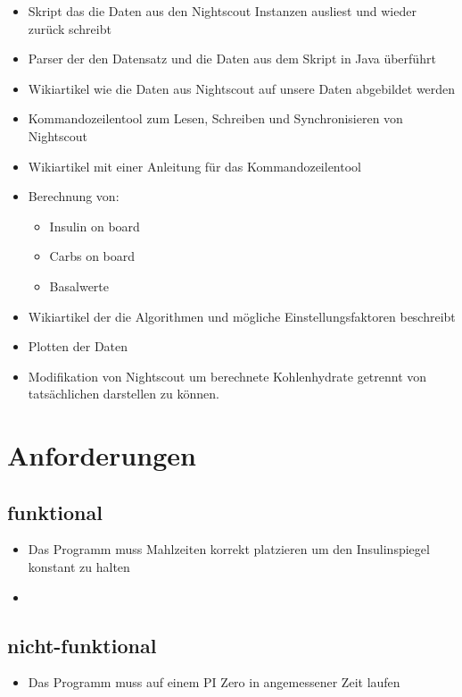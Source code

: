 \documentclass[accentcolor=tud0b,12pt,paper=a4]{tudreport}
\begin{document}
\begin{itemize}
	\item Skript das die Daten aus den Nightscout Instanzen ausliest und wieder zurück schreibt
	\item Parser der den Datensatz und die Daten aus dem Skript in Java überführt
	\item Wikiartikel wie die Daten aus Nightscout auf unsere Daten abgebildet werden
	\item Kommandozeilentool zum Lesen, Schreiben und Synchronisieren von Nightscout
	\item Wikiartikel mit einer Anleitung für das Kommandozeilentool
	\item Berechnung von:
	\begin{itemize}
		\item Insulin on board
		\item Carbs on board
		\item Basalwerte
	\end{itemize}
	\item Wikiartikel der die Algorithmen und mögliche Einstellungsfaktoren beschreibt
	\item Plotten der Daten
	\item Modifikation von Nightscout um berechnete Kohlenhydrate getrennt von tatsächlichen darstellen zu können.
\end{itemize}
	
	\section{Anforderungen}
	\subsection{funktional}
\begin{itemize}
	\item Das Programm muss Mahlzeiten korrekt platzieren um den Insulinspiegel konstant zu halten
	\item  
\end{itemize}
	
	\subsection{nicht-funktional}
\begin{itemize}
	\item Das Programm muss auf einem PI Zero in angemessener Zeit laufen
\end{itemize}
	
\end{document}
